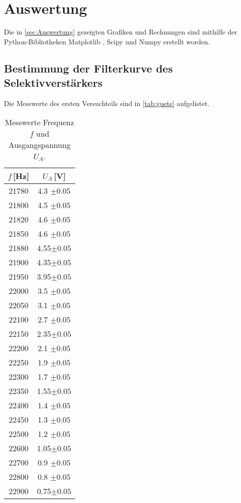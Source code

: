 \section{Auswertung}
\label{sec:Auswertung}
Die in \autoref{sec:Auswertung} gezeigten Grafiken und Rechnungen sind mithilfe der Python-Bibliotheken Matplotlib \cite{matplotlib}, Scipy \cite{scipy} und Numpy \cite{numpy}
erstellt worden.

\subsection{Bestimmung der Filterkurve des Selektivverstärkers}
Die Messwerte des ersten Versuchteils sind in \autoref{tab:guete} aufgelistet.

\begin{table}[H]
  \centering
  \caption{Messwerte Frequenz $f$ und Ausgangspannung $U_A$.}
  \begin{tabular}{c c}
      \toprule
      {$f\,$[Hz]} & {$U_A\,$[V]}\\
      \midrule
      21780 & 4.3 $\pm 0.05$ \\
      21800 & 4.5 $\pm 0.05$\\
      21820 & 4.6 $\pm 0.05$\\
      21850 & 4.6 $\pm 0.05$\\
      21880 & 4.55$\pm 0.05$ \\
      21900 & 4.35$\pm 0.05$ \\
      21950 & 3.95$\pm 0.05$ \\
      22000 & 3.5 $\pm 0.05$\\
      22050 & 3.1 $\pm 0.05$\\
      22100 & 2.7 $\pm 0.05$\\
      22150 & 2.35$\pm 0.05$ \\
      22200 & 2.1 $\pm 0.05$\\
      22250 & 1.9 $\pm 0.05$\\
      22300 & 1.7 $\pm 0.05$\\
      22350 & 1.55$\pm 0.05$ \\
      22400 & 1.4 $\pm 0.05$\\
      22450 & 1.3 $\pm 0.05$\\
      22500 & 1.2 $\pm 0.05$\\
      22600 & 1.05$\pm 0.05$ \\
      22700 & 0.9 $\pm 0.05$\\
      22800 & 0.8 $\pm 0.05$\\
      22900 & 0.75$\pm 0.05$ \\

\end{tabular}
\end{table}
